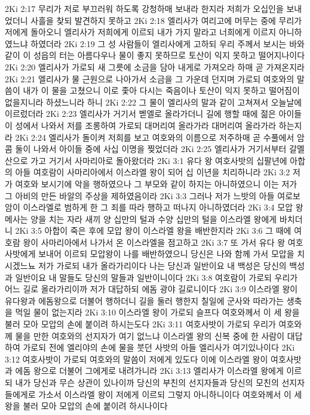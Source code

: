 2Ki 2:17  무리가 저로 부끄러워 하도록 강청하매 보내라 한지라 저희가 오십인을 보내었더니 사흘을 찾되 발견하지 못하고
2Ki 2:18  엘리사가 여리고에 머무는 중에 무리가 저에게 돌아오니 엘리사가 저희에게 이르되 내가 가지 말라고 너희에게 이르지 아니하였느냐 하였더라
2Ki 2:19  그 성 사람들이 엘리사에게 고하되 우리 주께서 보시는 바와 같이 이 성읍의 터는 아름다우나 물이 좋지 못하므로 토산이 익지 못하고 떨어지나이다
2Ki 2:20  엘리사가 가로되 새 그릇에 소금을 담아 내게로 가져오라 하매 곧 가져온지라
2Ki 2:21  엘리사가 물 근원으로 나아가서 소금을 그 가운데 던지며 가로되 여호와의 말씀이 내가 이 물을 고쳤으니 이로 좇아 다시는 죽음이나 토산이 익지 못하고 떨어짐이 없을지니라 하셨느니라 하니
2Ki 2:22  그 물이 엘리사의 말과 같이 고쳐져서 오늘날에 이르렀더라
2Ki 2:23  엘리사가 거기서 벧엘로 올라가더니 길에 행할 때에 젊은 아이들이 성에서 나와서 저를 조롱하여 가로되 대머리여 올라가라 대머리여 올라가라 하는지라
2Ki 2:24  엘리사가 돌이켜 저희를 보고 여호와의 이름으로 저주하매 곧 수풀에서 암콤 둘이 나와서 아이들 중에 사십 이명을 찢었더라
2Ki 2:25  엘리사가 거기서부터 갈멜산으로 가고 거기서 사마리아로 돌아왔더라
2Ki 3:1  유다 왕 여호사밧의 십팔년에 아합의 아들 여호람이 사마리아에서 이스라엘 왕이 되어 십 이년을 치리하니라
2Ki 3:2  저가 여호와 보시기에 악을 행하였으나 그 부모와 같이 하지는 아니하였으니 이는 저가 그 아비의 만든 바알의 주상을 제하였음이라
2Ki 3:3  그러나 저가 느밧의 아들 여로보암이 이스라엘로 범하게 한 그 죄를 따라 행하고 떠나지 아니하였더라
2Ki 3:4  모압 왕 메사는 양을 치는 자라 새끼 양 십만의 털과 수양 십만의 털을 이스라엘 왕에게 바치더니
2Ki 3:5  아합이 죽은 후에 모압 왕이 이스라엘 왕을 배반한지라
2Ki 3:6  그 때에 여호람 왕이 사마리아에서 나가서 온 이스라엘을 점고하고
2Ki 3:7  또 가서 유다 왕 여호사밧에게 보내어 이르되 모압왕이 나를 배반하였으니 당신은 나와 함께 가서 모압을 치시겠느뇨 저가 가로되 내가 올라가리이다 나는 당신과 일반이요 내 백성은 당신의 백성과 일반이요 내 말들도 당신의 말들과 일반이니이다
2Ki 3:8  여호람이 가로되 우리가 어느 길로 올라가리이까 저가 대답하되 에돔 광야 길로니이다
2Ki 3:9  이스라엘 왕이 유다왕과 에돔왕으로 더불어 행하더니 길을 둘러 행한지 칠일에 군사와 따라가는 생축을 먹일 물이 없는지라
2Ki 3:10  이스라엘 왕이 가로되 슬프다 여호와께서 이 세 왕을 불러 모아 모압의 손에 붙이려 하시는도다
2Ki 3:11  여호사밧이 가로되 우리가 여호와께 물을 만한 여호와의 선지자가 여기 없느냐 이스라엘 왕의 신복 중에 한 사람이 대답하여 가로되 전에 엘리야의 손에 물을 붓던 사밧의 아들 엘리사가 여기있나이다
2Ki 3:12  여호사밧이 가로되 여호와의 말씀이 저에게 있도다 이에 이스라엘 왕이 여호사밧과 에돔 왕으로 더불어 그에게로 내려가니라
2Ki 3:13  엘리사가 이스라엘 왕에게 이르되 내가 당신과 무슨 상관이 있나이까 당신의 부친의 선지자들과 당신의 모친의 선지자들에게로 가소서 이스라엘 왕이 저에게 이르되 그렇지 아니하니이다 여호와께서 이 세 왕을 불러 모아 모압의 손에 붙이려 하시나이다
